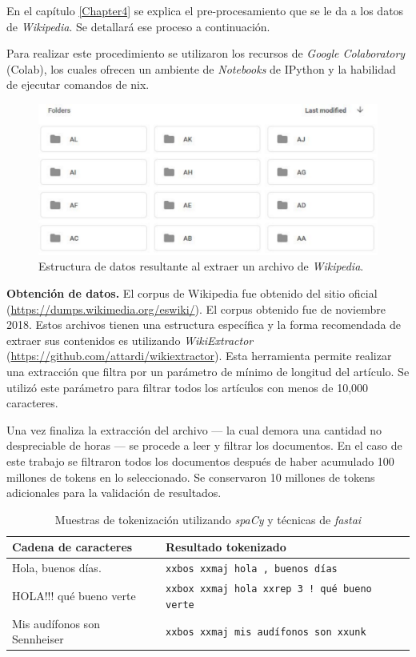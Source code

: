 En el capítulo \ref{Chapter4} se explica el pre-procesamiento que se le da a los datos de \textit{Wikipedia}. Se detallará ese proceso a continuación.

Para realizar este procedimiento se utilizaron los recursos de \emph{Google Colaboratory} (Colab), los cuales ofrecen un ambiente de \textit{Notebooks} de IPython y la habilidad de ejecutar comandos de \*nix.

\begin{figure}
\centering
\includegraphics[scale=0.7]{Figures/wikidump.pdf}
\caption{Estructura de datos resultante al extraer un archivo de \textit{Wikipedia}.}
\label{fig:wikidump}
\end{figure}


\textbf{Obtención de datos.} El corpus de Wikipedia fue obtenido del sitio oficial (\url{https://dumps.wikimedia.org/eswiki/}). El corpus obtenido fue de noviembre 2018. Estos archivos tienen una estructura específica y la forma recomendada de extraer sus contenidos es utilizando \emph{WikiExtractor} (\url{https://github.com/attardi/wikiextractor}). Esta herramienta permite realizar una extracción que filtra por un parámetro de mínimo de longitud del artículo. Se utilizó este parámetro para filtrar todos los artículos con menos de 10,000 caracteres.

Una vez finaliza la extracción del archivo --- la cual demora una cantidad no despreciable de horas --- se procede a leer y filtrar los documentos. En el caso de este trabajo se filtraron todos los documentos después de haber acumulado 100 millones de tokens en lo seleccionado. Se conservaron 10 millones de tokens adicionales para la validación de resultados.

\begin{table}
\begin{tabular}{| l | l |}

\hline
\textbf{Cadena de caracteres} & \textbf{Resultado tokenizado} \\
\hline
Hola, buenos días. & \texttt{xxbos xxmaj hola , buenos días} \\
HOLA!!! qué bueno verte & \texttt{xxbox xxmaj hola xxrep 3 ! qué bueno verte} \\
Mis audífonos son Sennheiser & \texttt{xxbos xxmaj mis audífonos son xxunk} \\
\hline

\end{tabular}
\caption{Muestras de tokenización utilizando \textit{spaCy} y técnicas de \textit{fastai}}
\label{tab:tokens}
\end{table}

